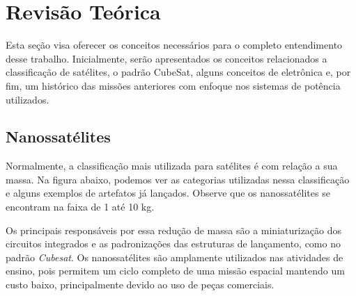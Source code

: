 \chapter{Revisão Teórica} \label{revisão}

Esta seção visa oferecer os conceitos necessários para o completo entendimento desse trabalho. Inicialmente, serão apresentados os conceitos relacionados a classificação de satélites, o padrão CubeSat, alguns conceitos de eletrônica e, por fim, um histórico das missões anteriores com enfoque nos sistemas de potência utilizados.

\section{Nanossatélites}\label{nanosats_revision}
Normalmente, a classificação mais utilizada para satélites é com relação a sua massa. Na figura abaixo, podemos ver as categorias utilizadas nessa classificação e alguns exemplos de artefatos já lançados. Observe que os nanossatélites se encontram na faixa de 1 até 10 kg.

\noindent
\begin{minipage}{\linewidth}
\label{mass_classification_fig}
\end{minipage}

 Os principais responsáveis por essa redução de massa são a miniaturização dos circuitos integrados e as padronizações das estruturas de lançamento, como no padrão \textit{Cubesat}. Os nanossatélites são amplamente utilizados nas atividades de ensino, pois permitem um ciclo completo de uma missão espacial mantendo um custo baixo, principalmente devido ao uso de peças comerciais.\cite{barnhart_ref}

